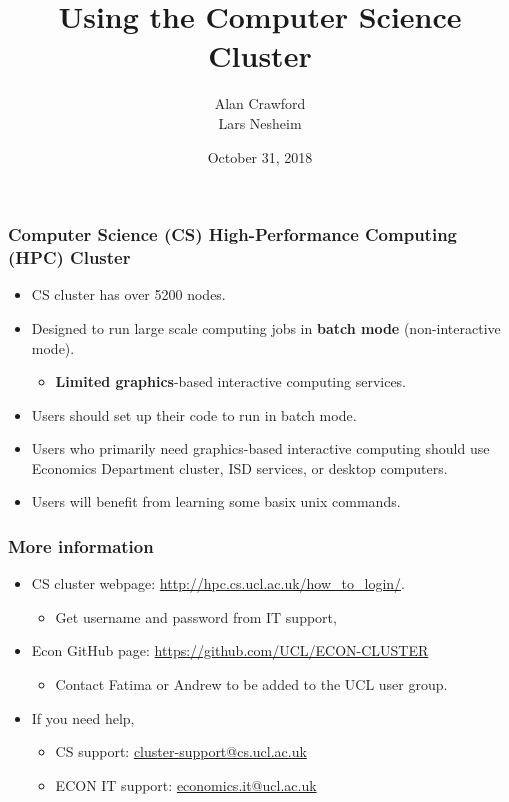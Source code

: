 \documentclass{beamer}
\title{Using the Computer Science Cluster}
\author{Alan Crawford \\
           Lars Nesheim}
\date{October 31, 2018}
\begin{document}
\lstset{language=Pascal}
\frame{\titlepage}


\begin{frame}
\frametitle{Computer Science (CS) High-Performance Computing (HPC) Cluster}

\begin{itemize}
\item CS cluster has over 5200 nodes.
\item Designed to run large scale computing jobs in \textbf{batch mode} (non-interactive mode).
\begin{itemize}
\item \textbf{Limited graphics}-based interactive computing services. 
\end{itemize}
\item Users should set up their code to run in batch mode.
\item Users who primarily need graphics-based interactive computing should use Economics Department cluster, ISD services, or desktop computers.
\item Users will benefit from learning some basix unix commands. 
\end{itemize}
\end{frame}

\begin{frame}
\frametitle{More information}
\begin{itemize}
\item CS cluster webpage: \textcolor{blue}{\url{http://hpc.cs.ucl.ac.uk/how_to_login/}}.
\begin{itemize}
\item Get username and password from IT support,
\end{itemize}
\item Econ GitHub page: \textcolor{blue}{\url{https://github.com/UCL/ECON-CLUSTER}}
\begin{itemize}
\item Contact Fatima or Andrew to be added to the UCL user group.
\end{itemize}
\item If you need help, 
\begin{itemize}
\item CS support: \textcolor{blue}{\url{cluster-support@cs.ucl.ac.uk}}
\item ECON IT support:  \textcolor{blue}{\url{economics.it@ucl.ac.uk}}
\end{itemize}
\end{itemize}
\end{frame}
\end{document}
